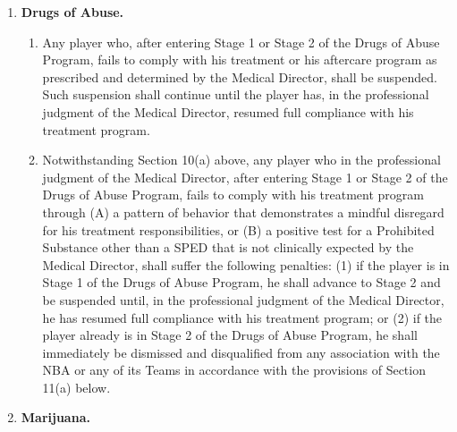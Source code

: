 \documentclass[
]{book}
\providecommand{\tightlist}{%
  \setlength{\itemsep}{0pt}\setlength{\parskip}{0pt}}
\begin{document}
\begin{enumerate}
\def\labelenumi{(\alph{enumi})}
\item
  \textbf{Drugs of Abuse.}

  \begin{enumerate}
  \def\labelenumii{(\roman{enumii})}
  \tightlist
  \item
    Any player who, after entering Stage 1 or Stage 2 of the Drugs of Abuse Program, fails to comply with his treatment or his aftercare program as prescribed and determined by the Medical Director, shall be suspended. Such suspension shall continue until the player has, in the professional judgment of the Medical Director, resumed full compliance with his treatment program.
  \item
    Notwithstanding Section 10(a) above, any player who in the professional judgment of the Medical Director, after entering Stage 1 or Stage 2 of the Drugs of Abuse Program, fails to comply with his treatment program through (A) a pattern of behavior that demonstrates a mindful disregard for his treatment responsibilities, or (B) a positive test for a Prohibited Substance other than a SPED that is not clinically expected by the Medical Director, shall suffer the following penalties:
    (1) if the player is in Stage 1 of the Drugs of Abuse Program, he shall advance to Stage 2 and be suspended until, in the professional judgment of the Medical Director, he has resumed full compliance with his treatment program; or
    (2) if the player already is in Stage 2 of the Drugs of Abuse Program, he shall immediately be dismissed and disqualified from any association with the NBA or any of its Teams in accordance with the provisions of Section 11(a) below.
  \end{enumerate}
\item
  \textbf{Marijuana.}


\end{enumerate}
\end{document}
